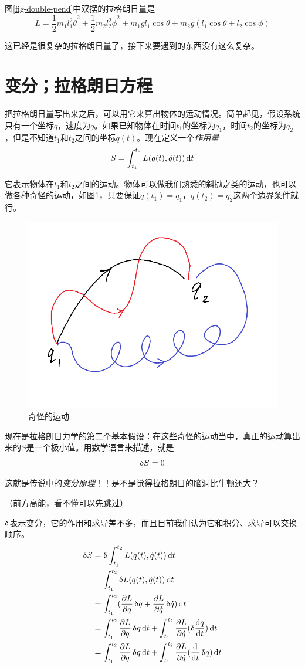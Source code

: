 图\ref{fig-double-pend}中双摆的拉格朗日量是
\begin{equation*}
L=\frac{1}{2}m_1 l_1^2 \dot \theta^2+\frac{1}{2}m_2 l_2^2 \dot \phi^2+m_1 g l_1 \cos \theta+m_2 g (l_1 \cos \theta+l_2 \cos \phi)
\end{equation*}

这已经是很复杂的拉格朗日量了，接下来要遇到的东西没有这么复杂。
\section{变分；拉格朗日方程}
把拉格朗日量写出来之后，可以用它来算出物体的运动情况。简单起见，假设系统只有一个坐标$q$，速度为$\dot q$。如果已知物体在时间$t_1$的坐标为$q_1$，时间$t_2$的坐标为$q_2$，但是不知道$t_1$和$t_2$之间的坐标$q(t)$。现在定义一个\emph{作用量}
\begin{equation*}
S=\int_{t_1}^{t_2} L(q(t),\dot q(t)) \mathop{}\!\mathrm{d} t
\end{equation*}

它表示物体在$t_1$和$t_2$之间的运动。物体可以做我们熟悉的斜抛之类的运动，也可以做各种奇怪的运动，如图\ref{fig-strange-move}，只要保证$q(t_1)=q_1$，$q(t_2)=q_2$这两个边界条件就行。
\begin{figure}[htb]
\centering
\includegraphics[width=0.33\linewidth]{fig/strange-move.png}
\caption{奇怪的运动}
\label{fig-strange-move}
\end{figure}

现在是拉格朗日力学的第二个基本假设：在这些奇怪的运动当中，真正的运动算出来的$S$是一个极小值。用数学语言来描述，就是
\begin{equation*}
\mathop{}\!\updelta S=0
\end{equation*}

这就是传说中的\emph{变分原理}！！是不是觉得拉格朗日的脑洞比牛顿还大？

（前方高能，看不懂可以先跳过）

$\mathop{}\!\updelta$表示变分，它的作用和求导差不多，而且目前我们认为它和积分、求导可以交换顺序。
\begin{align*}
\opvar S&=\opvar \int_{t_1}^{t_2} L(q(t),\dot q(t)) \opd t \\
&=\int_{t_1}^{t_2} \opvar L(q(t),\dot q(t)) \opd t \\
&=\int_{t_1}^{t_2}(\frac{\partial L}{\partial q} \opvar q+\frac{\partial L}{\partial \dot q} \opvar \dot q)\opd t \\
&=\int_{t_1}^{t_2}\frac{\partial L}{\partial q} \opvar q \opd t+\int_{t_1}^{t_2}\frac{\partial L}{\partial \dot q} (\opvar \frac{\opd q}{\opd t}) \opd t \\
&=\int_{t_1}^{t_2}\frac{\partial L}{\partial q} \opvar q \opd t+\int_{t_1}^{t_2}\frac{\partial L}{\partial \dot q} (\opdt \opvar q) \opd t
\end{align*}


